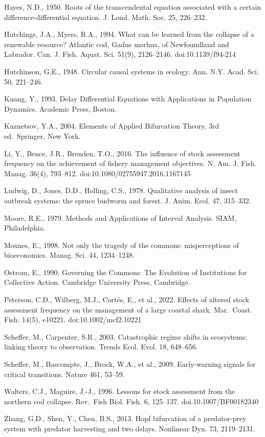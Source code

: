 \documentclass[11pt]{article}
\begin{document}
Hayes, N.D., 1950. Roots of the transcendental equation associated with
a certain difference-differential equation. J. Lond. Math. Soc. 25,
226--232.

Hutchings, J.A., Myers, R.A., 1994. What can be learned from the
collapse of a renewable resource? Atlantic cod, Gadus morhua, of
Newfoundland and Labrador. Can. J. Fish. Aquat. Sci. 51(9), 2126--2146.
doi:10.1139/f94-214

Hutchinson, G.E., 1948. Circular causal systems in ecology. Ann. N.Y.
Acad. Sci. 50, 221--246.

Kuang, Y., 1993. Delay Differential Equations with Applications in
Population Dynamics. Academic Press, Boston.

Kuznetsov, Y.A., 2004. Elements of Applied Bifurcation Theory, 3rd
ed.~Springer, New York.

Li, Y., Bence, J.R., Brenden, T.O., 2016. The influence of stock
assessment frequency on the achievement of fishery management
objectives. N. Am. J. Fish. Manag. 36(4), 793--812.
doi:10.1080/02755947.2016.1167145

Ludwig, D., Jones, D.D., Holling, C.S., 1978. Qualitative analysis of
insect outbreak systems: the spruce budworm and forest. J. Anim. Ecol.
47, 315--332.

Moore, R.E., 1979. Methods and Applications of Interval Analysis. SIAM,
Philadelphia.

Moxnes, E., 1998. Not only the tragedy of the commons: misperceptions of
bioeconomics. Manag. Sci. 44, 1234--1248.

Ostrom, E., 1990. Governing the Commons: The Evolution of Institutions
for Collective Action. Cambridge University Press, Cambridge.

Peterson, C.D., Wilberg, M.J., Cort\'es, E., et al., 2022. Effects of
altered stock assessment frequency on the management of a large coastal
shark. Mar.~Coast. Fish. 14(5), e10221. doi:10.1002/mcf2.10221

Scheffer, M., Carpenter, S.R., 2003. Catastrophic regime shifts in
ecosystems: linking theory to observation. Trends Ecol. Evol. 18,
648--656.

Scheffer, M., Bascompte, J., Brock, W.A., et al., 2009. Early-warning
signals for critical transitions. Nature 461, 53--59.

Walters, C.J., Maguire, J.-J., 1996. Lessons for stock assessment from
the northern cod collapse. Rev.~Fish Biol. Fish. 6, 125--137.
doi:10.1007/BF00182340

Zhang, G.D., Shen, Y., Chen, B.S., 2013. Hopf bifurcation of a
predator-prey system with predator harvesting and two delays. Nonlinear
Dyn. 73, 2119--2131.
\end{document}
